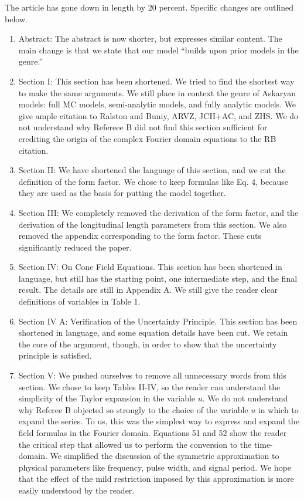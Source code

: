\documentclass[12pt]{article}
\begin{document}
The article has gone down in length by 20 percent.  Specific changes are outlined below.

\begin{enumerate}
\item Abstract: The abstract is now shorter, but expresses similar content.  The main change is that we state that our model ``builds upon prior models in the genre.''
\item Section I: This section has been shortened.  We tried to find the shortest way to make the same arguments.  We still place in context the genre of Askaryan models: full MC models, semi-analytic models, and fully analytic models.  We give ample citation to Ralston and Buniy, ARVZ, JCH+AC, and ZHS.  We do not understand why Refereee B did not find this section sufficient for crediting the origin of the complex Fourier domain equations to the RB citation.
\item Section II: We have shortened the language of this section, and we cut the definition of the form factor.  We chose to keep formulas like Eq. 4, because they are used as the basis for putting the model together.
\item Section III: We completely removed the derivation of the form factor, and the derivation of the longitudinal length parameters from this section.  We also removed the appendix corresponding to the form factor.  These cuts significantly reduced the paper.
\item Section IV: On Cone Field Equations.  This section has been shortened in language, but still has the starting point, one intermediate step, and the final result.  The details are still in Appendix A.  We still give the reader clear definitions of variables in Table 1.
\item Section IV A: Verification of the Uncertainty Principle.  This section has been shortened in language, and some equation details have been cut.  We retain the core of the argument, though, in order to show that the uncertainty principle is satisfied.
\item Section V: We pushed ourselves to remove all unnecessary words from this section.  We chose to keep Tables II-IV, so the reader can understand the simplicity of the Taylor expansion in the variable $u$.  We do not understand why Referee B objected so strongly to the choice of the variable $u$ in which to expand the series.  To us, this was the simplest way to express and expand the field formulas in the Fourier domain.  Equations 51 and 52 show the reader the critical step that allowed us to perform the conversion to the time-domain.  We simplified the discussion of the symmetric approximation to physical parameters like frequency, pulse width, and signal period.  We hope that the effect of the mild restriction imposed by this approximation is more easily understood by the reader.

\end{enumerate}
\end{document}
